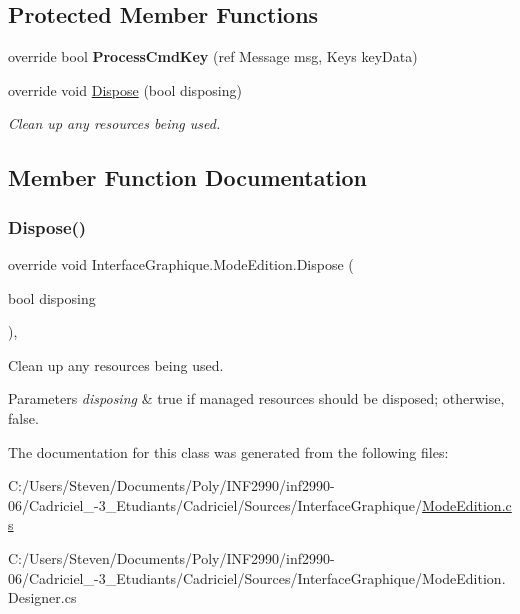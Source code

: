 \subsection*{Protected Member Functions}
\begin{DoxyCompactItemize}
\item 
override bool {\bfseries Process\+Cmd\+Key} (ref Message msg, Keys key\+Data)
\item 
override void \hyperlink{class_interface_graphique_1_1_mode_edition_abcb92e7500b3c90cdc6fcc24ae0c3234}{Dispose} (bool disposing)
\begin{DoxyCompactList}\small\item\em Clean up any resources being used. \end{DoxyCompactList}\end{DoxyCompactItemize}


\subsection{Member Function Documentation}
\hypertarget{class_interface_graphique_1_1_mode_edition_abcb92e7500b3c90cdc6fcc24ae0c3234}{}\label{class_interface_graphique_1_1_mode_edition_abcb92e7500b3c90cdc6fcc24ae0c3234} 
\subsubsection{\texorpdfstring{Dispose()}{Dispose()}}
{\footnotesize\ttfamily override void Interface\+Graphique.\+Mode\+Edition.\+Dispose (\begin{DoxyParamCaption}\item[{bool}]{disposing }\end{DoxyParamCaption})\hspace{0.3cm}{\ttfamily [inline]}, {\ttfamily [protected]}}



Clean up any resources being used. 


\begin{DoxyParams}{Parameters}
{\em disposing} & true if managed resources should be disposed; otherwise, false.\\
\hline
\end{DoxyParams}


The documentation for this class was generated from the following files\+:\begin{DoxyCompactItemize}
\item 
C\+:/\+Users/\+Steven/\+Documents/\+Poly/\+I\+N\+F2990/inf2990-\/06/\+Cadriciel\+\_-\/3\+\_\+\+Etudiants/\+Cadriciel/\+Sources/\+Interface\+Graphique/\hyperlink{_mode_edition_8cs}{Mode\+Edition.\+cs}\item 
C\+:/\+Users/\+Steven/\+Documents/\+Poly/\+I\+N\+F2990/inf2990-\/06/\+Cadriciel\+\_-\/3\+\_\+\+Etudiants/\+Cadriciel/\+Sources/\+Interface\+Graphique/Mode\+Edition.\+Designer.\+cs\end{DoxyCompactItemize}

